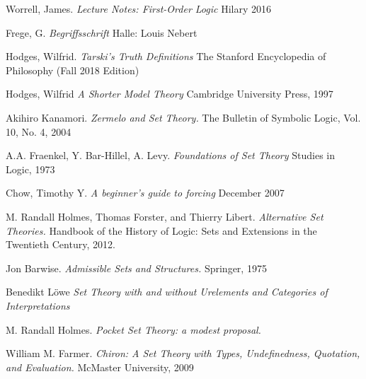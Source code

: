 \documentclass[11pt]{report}
\theoremstyle{definition}
\theoremstyle{theorem}
\theoremstyle{lemma}
\begin{document}
\begin{thebibliography}{9}
Worrell, James.
\textit{Lecture Notes: First-Order Logic}
Hilary 2016

Frege, G.
\textit{Begriffsschrift}
Halle: Louis Nebert

Hodges, Wilfrid.
\textit{Tarski's Truth Definitions}
The Stanford Encyclopedia of Philosophy (Fall 2018 Edition)

Hodges, Wilfrid
\textit{A Shorter Model Theory}
Cambridge University Press, 1997

Akihiro Kanamori.
\textit{Zermelo and Set Theory.}
The Bulletin of Symbolic Logic, Vol. 10, No. 4, 2004

A.A. Fraenkel, Y. Bar-Hillel, A. Levy.
\textit{Foundations of Set Theory}
Studies in Logic, 1973

Chow, Timothy Y.
\textit{A beginner's guide to forcing}
December 2007

M. Randall Holmes, Thomas Forster, and Thierry Libert.
\textit{Alternative Set Theories.}
Handbook of the History of Logic: Sets and Extensions in the Twentieth Century, 2012.

Jon Barwise.
\textit{Admissible Sets and Structures.}
Springer, 1975

Benedikt L\"owe
\textit{Set Theory with and without Urelements and Categories of Interpretations}

M. Randall Holmes.
\textit{Pocket Set Theory: a modest proposal.}

William M. Farmer.
\textit{Chiron: A Set Theory with Types,
Undefinedness, Quotation, and Evaluation.}
McMaster University, 2009

\end{thebibliography}
\end{document}
